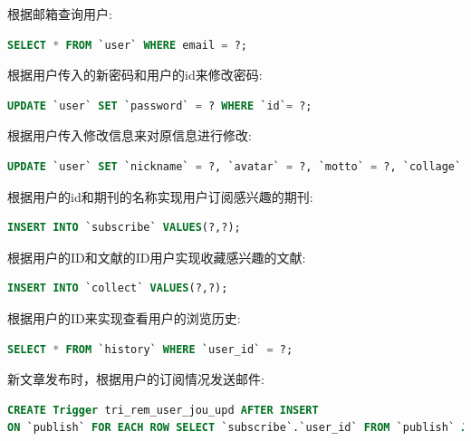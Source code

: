 \documentclass[UTF8,openany]{ctexbook}
\begin{document}
根据邮箱查询用户:

\begin{lstlisting}[language=SQL]
SELECT * FROM `user` WHERE email = ?;
\end{lstlisting}

根据用户传入的新密码和用户的id来修改密码:

\begin{lstlisting}[language=SQL]
UPDATE `user` SET `password` = ? WHERE `id`= ?;
\end{lstlisting}

根据用户传入修改信息来对原信息进行修改:

\begin{lstlisting}[language=SQL]
UPDATE `user` SET `nickname` = ?, `avatar` = ?, `motto` = ?, `collage` = ?, `subscribe_email` = ? `save_history` = ? WHERE `id` = ?;
\end{lstlisting}

根据用户的id和期刊的名称实现用户订阅感兴趣的期刊:

\begin{lstlisting}[language=SQL]
INSERT INTO `subscribe` VALUES(?,?);
\end{lstlisting}

根据用户的ID和文献的ID用户实现收藏感兴趣的文献:

\begin{lstlisting}[language=SQL]
INSERT INTO `collect` VALUES(?,?); 
\end{lstlisting}

根据用户的ID来实现查看用户的浏览历史:

\begin{lstlisting}[language=SQL]
SELECT * FROM `history` WHERE `user_id` = ?;
\end{lstlisting}

新文章发布时，根据用户的订阅情况发送邮件:

\begin{lstlisting}[language=SQL]
CREATE Trigger tri_rem_user_jou_upd AFTER INSERT
ON `publish` FOR EACH ROW SELECT `subscribe`.`user_id` FROM `publish` JOIN `journal` on new.journal_name = `journal`.`name` JOIN `subscribe` on `journal`.`name`=`subscribe`.`journal_name`;
\end{lstlisting}
\end{document}
